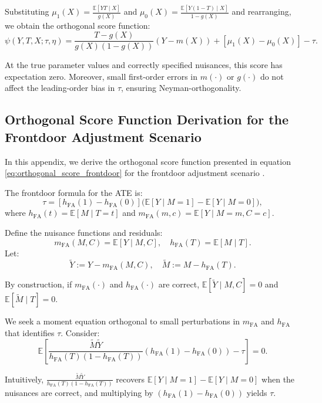 \documentclass{article}
\numberwithin{equation}{section}
\begin{document}
Substituting \(\mu_1(X) = \frac{\mathbb{E}[Y T \mid X]}{g(X)}\) and \(\mu_0(X)=\frac{\mathbb{E}[Y (1 - T) \mid X]}{1 - g(X)}\) and rearranging, we obtain the orthogonal score function:
\[
\psi(Y, T, X; \tau, \eta) 
= \frac{T - g(X)}{g(X)(1-g(X))}(Y - m(X)) + [\mu_1(X) - \mu_0(X)] - \tau.
\]

At the true parameter values and correctly specified nuisances, this score has expectation zero. Moreover, small first-order errors in \(m(\cdot)\) or \(g(\cdot)\) do not affect the leading-order bias in \(\tau\), ensuring Neyman-orthogonality.

\newpage
\subsection{Orthogonal Score Function Derivation for the Frontdoor Adjustment Scenario}
\label{subsec:appendix_orthogonal_score_function_frontdoor_adjustment_reformatted}

In this appendix, we derive the orthogonal score function presented in equation \eqref{eq:orthogonal_score_frontdoor} for the frontdoor adjustment scenario \cite{ChernozhukovChetverikovDemireretal2018, Pearl2009}.

The frontdoor formula for the ATE is:
\[
\tau = [h_{\text{FA}}(1) - h_{\text{FA}}(0)]\bigl(\mathbb{E}[Y \mid M=1] - \mathbb{E}[Y \mid M=0]\bigr),
\]
where \(h_{\text{FA}}(t)=\mathbb{E}[M \mid T=t]\) and \(m_{\text{FA}}(m,c)=\mathbb{E}[Y \mid M=m, C=c]\).

Define the nuisance functions and residuals:
\[
m_{\text{FA}}(M,C) = \mathbb{E}[Y \mid M,C], \quad h_{\text{FA}}(T) = \mathbb{E}[M \mid T].
\]
Let:
\[
\tilde{Y} := Y - m_{\text{FA}}(M,C), \quad \tilde{M} := M - h_{\text{FA}}(T).
\]

By construction, if \(m_{\text{FA}}(\cdot)\) and \(h_{\text{FA}}(\cdot)\) are correct, \(\mathbb{E}[\tilde{Y} \mid M,C]=0\) and \(\mathbb{E}[\tilde{M} \mid T]=0\).

We seek a moment equation orthogonal to small perturbations in \(m_{\text{FA}}\) and \(h_{\text{FA}}\) that identifies \(\tau\). Consider:
\[
\mathbb{E}\left[ \frac{\tilde{M}\tilde{Y}}{h_{\text{FA}}(T)(1-h_{\text{FA}}(T))}(h_{\text{FA}}(1)-h_{\text{FA}}(0)) - \tau \right] = 0.
\]

Intuitively, \(\frac{\tilde{M}\tilde{Y}}{h_{\text{FA}}(T)(1-h_{\text{FA}}(T))}\) recovers \(\mathbb{E}[Y \mid M=1]-\mathbb{E}[Y \mid M=0]\) when the nuisances are correct, and multiplying by \((h_{\text{FA}}(1)-h_{\text{FA}}(0))\) yields \(\tau\).
\end{document}
